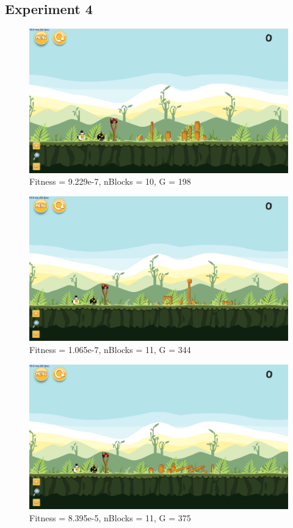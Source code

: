 \subsection{Experiment 4}\label{a:e4}

\begin{figure}[H]
	\centering
	\includegraphics[scale=0.35]{gfx/e4/level-0-second_crossover_min10_180602_035405.png}
	\caption{Fitness = 9.229e-7, nBlocks = 10, G = 198 }\label{f:e4-1}
\end{figure}

\begin{figure}[H]
	\centering
	\includegraphics[scale=0.35]{gfx/e4/level-0-second_crossover_min10_180603_040806.png}
	\caption{Fitness = 1.065e-7, nBlocks = 11, G = 344 }\label{f:e4-2}
\end{figure}

\begin{figure}[H]
	\centering
	\includegraphics[scale=0.35]{gfx/e4/level-0-second_crossover_min10_180606_233100.png}
	\caption{Fitness = 8.395e-5, nBlocks = 11, G = 375 }\label{f:e4-3}
\end{figure}

